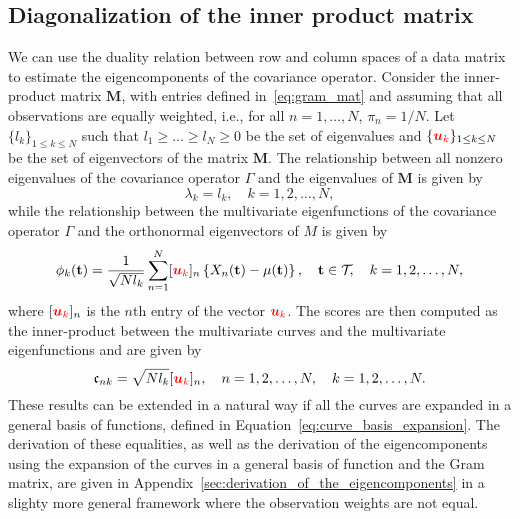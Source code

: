 \subsection{Diagonalization of the inner product matrix} %
\label{sub:by_diagonalization_of_the_inner_product_matrix}

We can use the duality relation between row and column spaces of a data matrix to estimate the eigencomponents of the covariance operator. Consider the inner-product matrix $\mathbf{M}$, with entries defined in~\eqref{eq:gram_mat} and assuming that all observations are equally weighted, i.e., for all $n = 1, \dots, N$, $\pi_n = 1/N$.
Let $\{l_k\}_{1 \leq k \leq N}$ such that $l_1 \geq \dots \geq l_N \geq 0$ be the set of eigenvalues and $\{\textcolor{red}{\boldsymbol{u}_k}\}_{1 \leq k \leq N}$ be the set of eigenvectors of the matrix $\mathbf{M}$. The relationship between all nonzero eigenvalues of the covariance operator $\Gamma$ and the eigenvalues of $\mathbf{M}$ is given by
\begin{equation}\label{eq:eigenvalues_relation_p}
    \lambda_k = l_k, \quad k = 1, 2, \dots, N,
\end{equation}
while the relationship between the multivariate eigenfunctions of the covariance operator $\Gamma$ and the orthonormal eigenvectors of $M$ is given by
\begin{equation}\label{eq:eigenfunction_relation_p}
    \phi_k(\mathbf{t}) = \frac{1}{\sqrt{N l_k}}\sum_{n = 1}^N [\textcolor{red}{\boldsymbol{u}_{k}}]_n\left\{X_n(\mathbf{t}) - \mu(\mathbf{t})\right\}, \quad \mathbf{t} \in \mathcal{T}_{}, \quad k = 1, 2, \dots, N, 
\end{equation}
where $[\textcolor{red}{\boldsymbol{u}_{k}}]_n$ is the $n$th entry of the vector $\textcolor{red}{\boldsymbol{u}_k}$. The scores are then computed as the inner-product between the multivariate curves and the multivariate eigenfunctions and are given by
\begin{equation}\label{eq:scores_relation_p}
    \mathfrak{c}_{nk} = \sqrt{N l_k}[\textcolor{red}{\boldsymbol{u}_{k}}]_n, \quad n = 1, 2, \dots, N, \quad k = 1, 2, \dots, N. 
\end{equation}
These results can be extended in a natural way if all the curves are expanded in a general basis of functions, defined in Equation~\eqref{eq:curve_basis_expansion}.
The derivation of these equalities, as well as the derivation of the eigencomponents using the expansion of the curves in a general basis of function and the Gram matrix, are given in Appendix~\ref{sec:derivation_of_the_eigencomponents} in a slighty more general framework where the observation weights are not equal.

